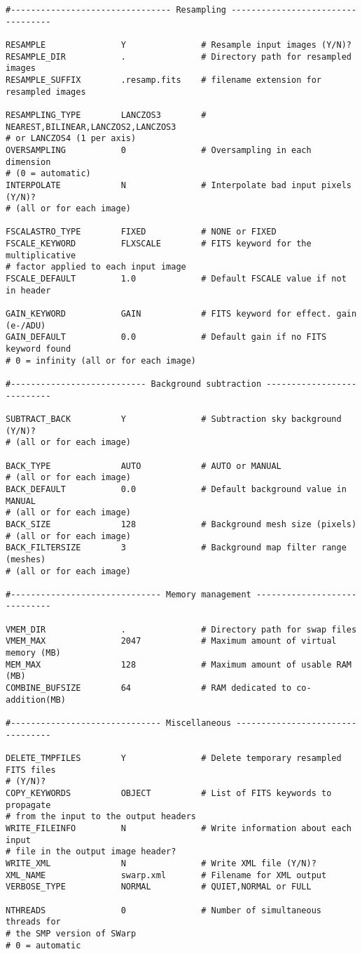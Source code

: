 \documentclass[apj, revtex4]{emulateapj}
\begin{document}
\begin{verbatim}
#-------------------------------- Resampling ----------------------------------

RESAMPLE               Y               # Resample input images (Y/N)?
RESAMPLE_DIR           .               # Directory path for resampled images
RESAMPLE_SUFFIX        .resamp.fits    # filename extension for resampled images

RESAMPLING_TYPE        LANCZOS3        # NEAREST,BILINEAR,LANCZOS2,LANCZOS3
# or LANCZOS4 (1 per axis)
OVERSAMPLING           0               # Oversampling in each dimension
# (0 = automatic)
INTERPOLATE            N               # Interpolate bad input pixels (Y/N)?
# (all or for each image)

FSCALASTRO_TYPE        FIXED           # NONE or FIXED
FSCALE_KEYWORD         FLXSCALE        # FITS keyword for the multiplicative
# factor applied to each input image
FSCALE_DEFAULT         1.0             # Default FSCALE value if not in header

GAIN_KEYWORD           GAIN            # FITS keyword for effect. gain (e-/ADU)
GAIN_DEFAULT           0.0             # Default gain if no FITS keyword found
# 0 = infinity (all or for each image)

#--------------------------- Background subtraction ---------------------------

SUBTRACT_BACK          Y               # Subtraction sky background (Y/N)?
# (all or for each image)

BACK_TYPE              AUTO            # AUTO or MANUAL
# (all or for each image)
BACK_DEFAULT           0.0             # Default background value in MANUAL
# (all or for each image)
BACK_SIZE              128             # Background mesh size (pixels)
# (all or for each image)
BACK_FILTERSIZE        3               # Background map filter range (meshes)
# (all or for each image)

#------------------------------ Memory management -----------------------------

VMEM_DIR               .               # Directory path for swap files
VMEM_MAX               2047            # Maximum amount of virtual memory (MB)
MEM_MAX                128             # Maximum amount of usable RAM (MB)
COMBINE_BUFSIZE        64              # RAM dedicated to co-addition(MB)

#------------------------------ Miscellaneous ---------------------------------

DELETE_TMPFILES        Y               # Delete temporary resampled FITS files
# (Y/N)?
COPY_KEYWORDS          OBJECT          # List of FITS keywords to propagate
# from the input to the output headers
WRITE_FILEINFO         N               # Write information about each input
# file in the output image header?
WRITE_XML              N               # Write XML file (Y/N)?
XML_NAME               swarp.xml       # Filename for XML output
VERBOSE_TYPE           NORMAL          # QUIET,NORMAL or FULL

NTHREADS               0               # Number of simultaneous threads for
# the SMP version of SWarp
# 0 = automatic
\end{verbatim}
\end{document}
